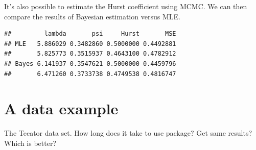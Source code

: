 \documentclass[english, 11pt]{article}
\begin{document}
It's also possible to estimate the Hurst coefficient using MCMC. We can then compare the results of Bayesian estimation versus MLE.



\begin{knitrout}
\color{fgcolor}\begin{kframe}
\begin{verbatim}
##         lambda       psi     Hurst       MSE
## MLE   5.886029 0.3482860 0.5000000 0.4492881
##       5.825773 0.3515937 0.4643100 0.4782912
## Bayes 6.141937 0.3547621 0.5000000 0.4459796
##       6.471260 0.3733738 0.4749538 0.4816747
\end{verbatim}
\end{kframe}
\end{knitrout}

\section{A data example}

The Tecator data set. How long does it take to use  package? Get same results? Which is better?
\end{document}
